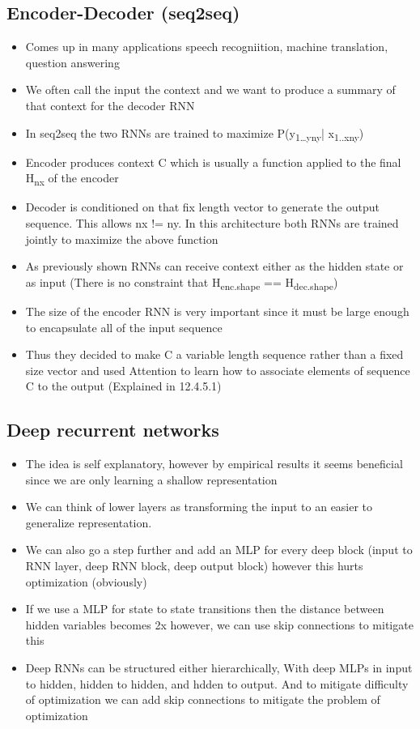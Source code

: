 \documentclass[11pt]{article}
\begin{document}
\subsection{Encoder-Decoder (seq2seq)}
\label{sec:orgae7fc88}
\begin{itemize}
\item Comes up in many applications speech recogniition, machine translation, question answering
\item We often call the input the context and we want to produce a summary of that context for the decoder RNN
\item In seq2seq the two RNNs are trained to maximize P(y\textsubscript{1\ldots{}y}\textsubscript{ny}| x\textsubscript{1..x}\textsubscript{ny})
\item Encoder produces context C which is usually a function applied to the final H\textsubscript{nx} of the encoder
\item Decoder is conditioned on that fix length vector to generate the output sequence. This allows nx != ny. In this architecture both RNNs are trained jointly to maximize the above function
\item As previously shown RNNs can receive context either as the hidden state or as input (There is no constraint that H\textsubscript{enc.shape} == H\textsubscript{dec.shape})
\item The size of the encoder RNN is very important since it must be large enough to encapsulate all of the input sequence
\item Thus they decided to make C a variable length sequence rather than a fixed size vector and used Attention to learn how to associate elements of sequence C to the output (Explained in 12.4.5.1)
\end{itemize}
\subsection{Deep recurrent networks}
\label{sec:orgf7d919d}
\begin{itemize}
\item The idea is self explanatory, however by empirical results it seems beneficial since we are only learning a shallow representation
\item We can think of lower layers as transforming the input to an easier to generalize representation.
\item We can also go a step further and add an MLP for every deep block (input to RNN layer, deep RNN block, deep output block) however this hurts optimization (obviously)
\item If we use a MLP for state to state transitions then the distance between hidden variables becomes 2x however, we can use skip connections to mitigate this
\item Deep RNNs can be structured either hierarchically, With deep MLPs in input to hidden, hidden to hidden, and hdden to output. And to mitigate difficulty of optimization we can add skip connections to mitigate the problem of optimization
\end{itemize}
\end{document}
